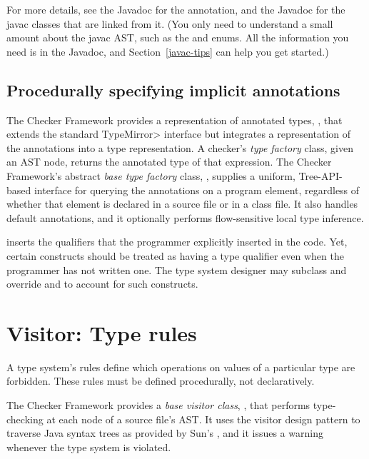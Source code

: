 For more details, see the Javadoc for the 
  annotation, and the Javadoc for the javac classes that are linked from
it.  (You only need to understand a small amount about the javac AST, such
as the
and
enums.  All the information you need is in the Javadoc, and
Section~\ref{javac-tips} can help you get started.)


\subsection{Procedurally specifying implicit annotations}


The Checker Framework provides a representation of annotated types,
, that extends the standard \<TypeMirror>
interface but integrates a representation of the annotations into a
type representation.  A checker's \emph{type factory} class, given an AST
node, returns the annotated type of that expression.  The Checker
Framework's abstract
\emph{base type factory} class, ,
supplies a uniform, Tree-API-based interface
for querying the annotations on a program element, regardless of
whether that element is declared in a source file or in a class file.
It also handles default annotations, and it optionally performs
flow-sensitive local type inference.

 inserts the qualifiers that the programmer
explicitly inserted in the code.  Yet, certain constructs should be
treated as having a type qualifier even when the programmer has not
written one.  The type system designer may subclass
 and override
 and
 to account for
such constructs.


\section{Visitor: Type rules\label{extending-visitor}}

A type system's rules define which operations on values of a
particular type are forbidden.
These rules must be defined procedurally, not declaratively.

The Checker Framework provides a \textit{base visitor class},
, that performs type-checking at each node of a
source file's AST\@.  It uses the visitor design pattern to traverse
Java syntax trees as provided by Sun's
,
and it issues a warning whenever the type system is violated.

